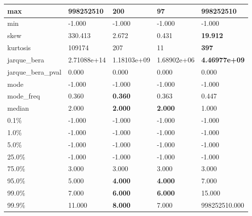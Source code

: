 \begin{table}[H]
\begin{tabular}{|l|m{10em}|m{10em}|m{10em}|m{10em}|}
\hline max & 998252510 & 200 & \cellcolor[rgb]{0.9, 0.54, 0.52} 97 & \bfseries 998252510 \\
\hline min & -1.000 & -1.000 & -1.000 & -1.000 \\
\hline skew & 330.413 & 2.672 & \cellcolor[rgb]{0.9, 0.54, 0.52} 0.431 & \bfseries 19.912 \\
\hline kurtosis & 109174 & 207 & \cellcolor[rgb]{0.9, 0.54, 0.52} 11 & \bfseries 397 \\
\hline jarque\_bera & 2.71088e+14 & 1.18103e+09 & \cellcolor[rgb]{0.9, 0.54, 0.52} 1.68902e+06 & \bfseries 4.46977e+09 \\
\hline jarque\_bera\_pval & 0.000 & 0.000 & 0.000 & 0.000 \\
\hline mode & -1.000 & -1.000 & -1.000 & -1.000 \\
\hline mode\_freq & 0.360 & \bfseries 0.360 & 0.363 & \cellcolor[rgb]{0.9, 0.54, 0.52} 0.447 \\
\hline median & 2.000 & \bfseries 2.000 & \bfseries 2.000 & \cellcolor[rgb]{0.9, 0.54, 0.52} 1.000 \\
\hline 0.1\% & -1.000 & -1.000 & -1.000 & -1.000 \\
\hline 1.0\% & -1.000 & -1.000 & -1.000 & -1.000 \\
\hline 5.0\% & -1.000 & -1.000 & -1.000 & -1.000 \\
\hline 25.0\% & -1.000 & -1.000 & -1.000 & -1.000 \\
\hline 75.0\% & 3.000 & 3.000 & 3.000 & 3.000 \\
\hline 95.0\% & 5.000 & \bfseries 4.000 & \bfseries 4.000 & \cellcolor[rgb]{0.9, 0.54, 0.52} 7.000 \\
\hline 99.0\% & 7.000 & \bfseries 6.000 & \bfseries 6.000 & \cellcolor[rgb]{0.9, 0.54, 0.52} 15.000 \\
\hline 99.9\% & 11.000 & \bfseries 8.000 & 7.000 & \cellcolor[rgb]{0.9, 0.54, 0.52} 998252510.000 \\
\hline
\end{tabular}
\end{table}
